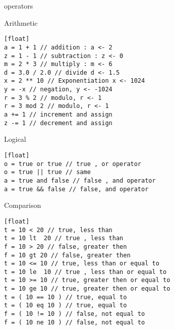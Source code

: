 \begin{section}{operators}


\begin{subsection}{Arithmetic}

\begin{lstlisting}[style=JexlStyle][float]
a = 1 + 1 // addition : a <- 2
z = 1 - 1 // subtraction : z <- 0
m = 2 * 3 // multiply : m <- 6
d = 3.0 / 2.0 // divide d <- 1.5   
x = 2 ** 10 // Exponentiation x <- 1024
y = -x // negation, y <- -1024 
r = 3 % 2 // modulo, r <- 1 
r = 3 mod 2 // modulo, r <- 1    
a += 1 // increment and assign 
z -= 1 // decrement and assign 
\end{lstlisting}

\end{subsection}

\begin{subsection}{Logical}

\begin{lstlisting}[style=JexlStyle][float]
o = true or true // true , or operator 
o = true || true // same 
a = true and false // false , and operator 
a = true && false // false, and operator  
\end{lstlisting}

\end{subsection}


\begin{subsection}{Comparison}

\begin{lstlisting}[style=JexlStyle][float]
t = 10 < 20 // true, less than
t = 10 lt  20 // true , less than 
f = 10 > 20 // false, greater then 
f = 10 gt 20 // false, greater then 
t = 10 <= 10 // true, less than or equal to 
t = 10 le  10 // true , less than or equal to 
t = 10 >= 10 // true, greater then or equal to 
t = 10 ge 10 // true, greater then or equal to 
t = ( 10 == 10 ) // true, equal to 
t = ( 10 eq 10 ) // true, equal to 
f = ( 10 != 10 ) // false, not equal to 
f = ( 10 ne 10 ) // false, not equal to 
\end{lstlisting}

\end{subsection}

\end{section}



